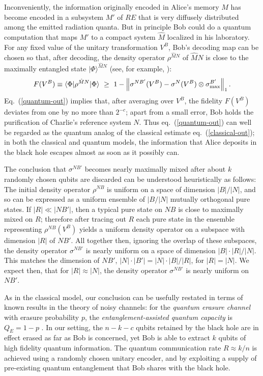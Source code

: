 \documentclass[11pt]{article}
\begin{document}
Inconveniently, the information originally encoded in Alice's memory $M$ has become encoded in a subsystem $M'$ of $RE$ that is very diffusely distributed among the emitted radiation quanta. But in principle Bob could do a quantum computation that maps $M'$ to a compact system $\hat M$ localized in his laboratory. For any fixed value of the unitary transformation $V^B$, Bob's decoding map can be chosen so that, after decoding, the density operator $\rho^{\hat M N}$ of $\hat MN$ is close to the maximally entangled state $|\Phi\rangle^{\hat MN}$ (see, for example, \cite{yard}):
\begin{equation}
F(V^B) \equiv \langle \Phi|\rho^{\hat MN}|\Phi\rangle~\ge ~ 1-\left\| \sigma^{NB'}(V^B)-\sigma^{N}(V^B)\otimes \sigma^{B'}_{\rm max}\right\|_1.
\end{equation}
Eq.~(\ref{quantum-out}) implies that, after averaging over $V^B$, the fidelity $F(V^B)$ deviates from one by no more than $2^{-c}$; apart from a small error, Bob holds the purification of Charlie's reference system $N$. Thus eq.~(\ref{quantum-out}) can well be regarded as the quantum analog of the classical estimate eq.~(\ref{classical-out}); in both the classical and quantum models, the information that Alice deposits in the black hole escapes almost as soon as it possibly can. 

The conclusion that $\sigma^{NB'}$ becomes nearly maximally mixed after about $k$ randomly chosen qubits are discarded can be understood heuristically as follows: The initial density operator $\rho^{NB}$ is uniform on a space of dimension $|B|/|N|$, and so can be expressed as a uniform ensemble of $|B/|N|$ mutually orthogonal pure states.  If $|R| \ll |NB'|$, then a typical pure state on $NB$ is close to maximally mixed on $R$; therefore after tracing out $R$ each pure state in the ensemble representing $\rho^{NB}(V^B)$ yields a uniform density operator on a subspace with dimension $|R|$ of $NB'$. All together then, ignoring the overlap of these subspaces, the density operator $\sigma^{NB'}$ is nearly uniform on a space of dimension $|B|\cdot |R|/|N|$. This matches the dimension of $NB'$, $|N|\cdot |B'|=|N|\cdot |B|/|R|$, for $|R|=|N|$. We expect then, that for $|R|\approx |N|$, the density operator $\sigma^{NB'}$ is nearly uniform on $NB'$. 

As in the classical model, our conclusion can be usefully restated in terms of known results in the theory of noisy channels: for the {\em quantum erasure channel} with erasure probability $p$, the {\em entanglement-assisted quantum capacity} is $Q_E=1-p$ \cite{thapliyal}. In our setting, the $n-k-c$ qubits retained by the black hole are in effect erased as far as Bob is concerned, yet Bob is able to extract $k$ qubits of high fidelity quantum information. The quantum communication rate $R\approx k/n$ is achieved using a randomly chosen unitary encoder, and by exploiting a supply of pre-existing quantum entanglement that Bob shares with the black hole. 
\end{document}
